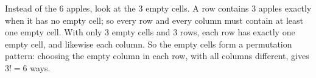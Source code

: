 Instead of the $6$ apples, look at the $3$ empty cells. A row contains $3$ apples exactly when it has no empty cell; so every row and every column must contain at least one empty cell. With only $3$ empty cells and $3$ rows, each row has exactly one empty cell, and likewise each column. So the empty cells form a permutation pattern: choosing the empty column in each row, with all columns different, gives $3!=\boxed{6}$ ways.
